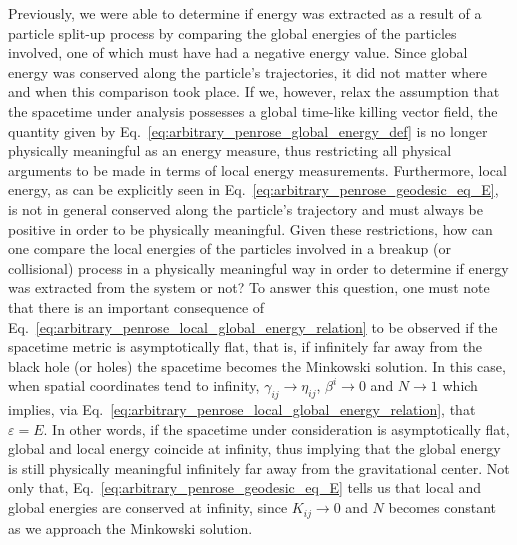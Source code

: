 Previously, we were able to determine if energy was extracted as a result of a particle split-up process by comparing the global energies of the particles involved, one of which must have had a negative energy value. Since global energy was conserved along the particle's trajectories, it did not matter where and when this comparison took place. If we, however, relax the assumption that the spacetime under analysis possesses a global time-like killing vector field, the quantity given by Eq.~\eqref{eq:arbitrary_penrose_global_energy_def} is no longer physically meaningful as an energy measure, thus restricting all physical arguments to be made in terms of local energy measurements. Furthermore, local energy, as can be explicitly seen in Eq.~\eqref{eq:arbitrary_penrose_geodesic_eq_E}, is not in general conserved along the particle's trajectory and must always be positive in order to be physically meaningful. Given these restrictions, how can one compare the local energies of the particles involved in a breakup (or collisional) process in a physically meaningful way in order to determine if energy was extracted from the system or not? To answer this question, one must note that there is an important consequence of Eq.~\eqref{eq:arbitrary_penrose_local_global_energy_relation} to be observed if the spacetime metric is asymptotically flat, that is, if infinitely far away from the black hole (or holes) the spacetime becomes the Minkowski solution. In this case, when spatial coordinates tend to infinity, $\gamma_{ij} \rightarrow \eta_{ij}$, $\beta^i \rightarrow 0$ and $N \rightarrow 1$ which implies, via Eq.~\eqref{eq:arbitrary_penrose_local_global_energy_relation}, that $\varepsilon = E$. In other words, if the spacetime under consideration is asymptotically flat, global and local energy coincide at infinity, thus implying that the global energy is still physically meaningful infinitely far away from the gravitational center. Not only that, Eq.~\eqref{eq:arbitrary_penrose_geodesic_eq_E} tells us that local and global energies are conserved at infinity, since $K_{ij} \rightarrow 0$ and $N$ becomes constant as we approach the Minkowski solution.

